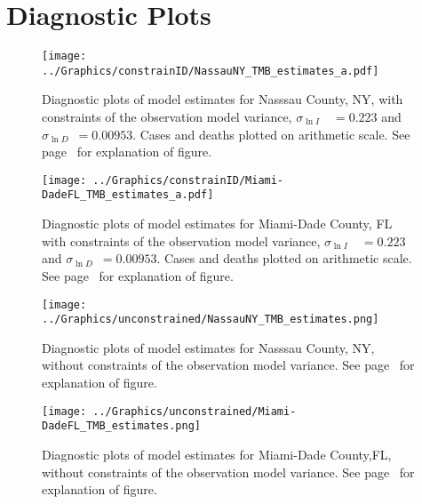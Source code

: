 \documentclass[12pt,letterpaper]{article}
\newcommand\slI{$\sigma_{\ln I}$\ }
\newcommand\slD{$\sigma_{\ln D}$}
\begin{document}
\begin{appendices}
\begin{sidewaystable}
{%
}\end{sidewaystable}



\clearpage
\section{Diagnostic Plots}

\begin{figure}[h!]
\begin{center}
\texttt{[image: ../Graphics/constrainID/NassauNY\_TMB\_estimates\_a.pdf]}
\end{center}
\caption{\label{fig:estsNaNYca}
Diagnostic plots of model estimates for Nasssau County, NY, 
with constraints of the observation model variance, 
\slI~$ = 0.223$ and \slD~$= 0.00953$. 
Cases and deaths plotted on arithmetic scale.
See page~\pageref{pp:diagexpl} for explanation of figure.
}
\end{figure}
\clearpage

\begin{figure}
\begin{center}
\texttt{[image: ../Graphics/constrainID/Miami-DadeFL\_TMB\_estimates\_a.pdf]}
\end{center}
\caption{\label{fig:estsMDFLca}
Diagnostic plots of model estimates for Miami-Dade County, FL
with constraints of the observation model variance, 
\slI~$ = 0.223$ and \slD~$= 0.00953$. 
Cases and deaths plotted on arithmetic scale.
See page~\pageref{pp:diagexpl} for explanation of figure.
}
\end{figure}

\begin{figure}[h!]
\begin{center}
\texttt{[image: ../Graphics/unconstrained/NassauNY\_TMB\_estimates.png]}
\end{center}
\caption{\label{fig:estsNaNYu}
Diagnostic plots of model estimates for Nasssau County, NY, 
without constraints of the observation model variance. 
See page~\pageref{pp:diagexpl} for explanation of figure.
}
\end{figure}
\clearpage

\begin{figure}
\begin{center}
\texttt{[image: ../Graphics/unconstrained/Miami-DadeFL\_TMB\_estimates.png]}
\end{center}
\caption{\label{fig:estsMDFLu}
Diagnostic plots of model estimates for Miami-Dade County,FL,
without constraints of the observation model variance. 
See page~\pageref{pp:diagexpl} for explanation of figure.
}
\end{figure}

\end{appendices}
\end{document}
